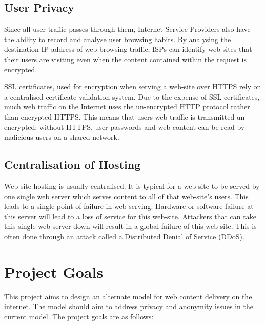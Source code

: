 \subsection{User Privacy}

Since all user traffic passes through them, Internet Service Providers also have
the ability to record and analyse user browsing habits. By analysing the destination
IP address of web-browsing traffic, ISPs can identify web-sites
that their users are visiting even when the content contained within the request is
encrypted.

SSL certificates, used for encryption when serving a web-site over HTTPS rely on a
centralised certificate-validation system. Due to the expense of SSL certificates,
much web traffic on the Internet uses the un-encrypted HTTP protocol rather than
encrypted HTTPS. This means that users web traffic is transmitted un-encrypted: without
HTTPS, user passwords and web content can be read by malicious users on a shared network.

\subsection{Centralisation of Hosting}

Web-site hosting is usually centralised. It is typical for a web-site to be served by
one single web server which serves content to all of that web-site's users. This leads
to a single-point-of-failure in web serving. Hardware or software failure at this server
will lead to a loss of service for this web-site. Attackers that can take this single web-server
down will result in a global failure of this web-site. This is often done through an attack
called a Distributed Denial of Service (DDoS).

\section{Project Goals}

This project aims to design an alternate model for web content delivery on the internet.
The model should aim to address privacy and anonymity issues in the current model.
The project goals are as follows:

